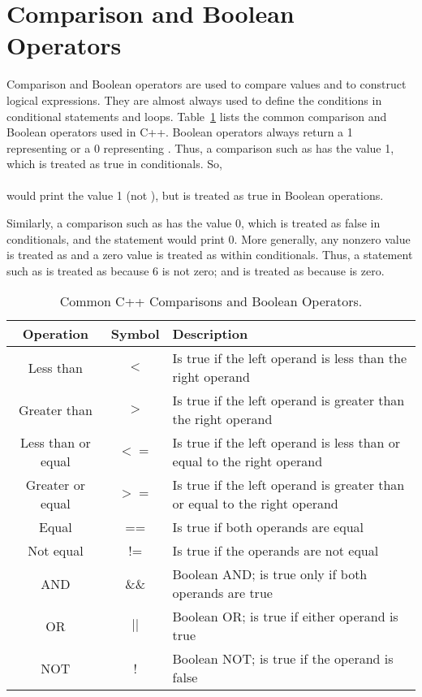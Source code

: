 \section{Comparison and Boolean Operators}\label{appendix:Boolean}

Comparison and Boolean operators are used to compare values and to construct logical expressions.  They are almost always used to define the conditions in conditional statements and loops.
Table~\ref{tab:BooleanOperators} lists the common comparison and Boolean operators used in C++.  Boolean operators always return a 1 representing  or a 0 representing .  Thus, a comparison such as  has the value 1, which is treated as true in conditionals.  So,\\
\\ would print the value 1 (not ), but  is treated as true in Boolean operations.
 
Similarly, a comparison such as  has the value 0, which is treated as false in conditionals, and the statement
 would print 0.  
More generally, any nonzero value is treated as  and a zero value is treated as  within conditionals.  Thus, a statement such as  is treated as  because 6 is not zero; and  is treated as  because  is zero.

\begin{table}
\centering
\caption{Common C++ Comparisons and Boolean Operators.}
\begin{tabular}{|  c  | c |  p{7cm} |}
\hline
\textbf{Operation} &  \textbf{Symbol} & \textbf{Description} \\
\hline
Less than & $<$ & Is true if the left operand is less than the right operand\\
\hline
Greater than & $>$ & Is true if the left operand is greater than the right operand \\
\hline
Less than or equal  & $<=$ & Is true if the left operand is less than or equal to the right operand\\
\hline 
Greater or equal  & $>=$ & Is true if the left operand is greater than or equal to the right operand \\
\hline
Equal  & == & Is true if both operands are equal \\
\hline
Not equal & != & Is true if the operands are not equal \\
\hline
AND & \&\& & Boolean AND; is true only if both operands are true \\
\hline 
OR & $||$ & Boolean OR; is true if either operand is true \\
\hline 
NOT & ! & Boolean NOT; is true if the operand is false \\
\hline
\end{tabular}\label{tab:BooleanOperators}
\end{table}

